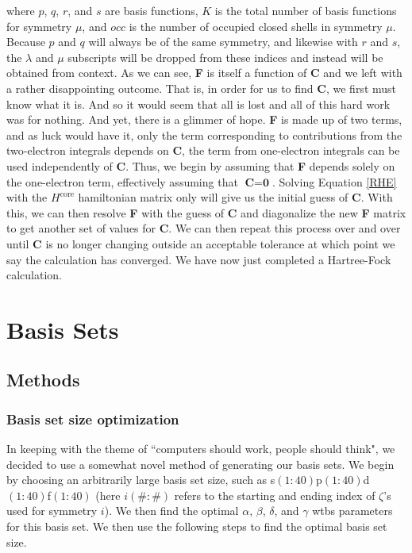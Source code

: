 \documentclass[12pt]{report}
\begin{document}
where $p$, $q$, $r$, and $s$ are basis functions, $K$ is the total number of basis functions for symmetry $\mu$, and $occ$ is the number of occupied closed shells in symmetry $\mu$. Because $p$ and $q$ will always be of the same symmetry, and likewise with $r$ and $s$, the $\lambda$ and $\mu$ subscripts will be dropped from these indices and instead will be obtained from context. As we can see, \textbf{F} is itself a function of \textbf{C} and we left with a rather disappointing outcome. That is, in order for us to find \textbf{C}, we first must know what it is. And so it would seem that all is lost and all of this hard work was for nothing. And yet, there is a glimmer of hope. \textbf{F} is made up of two terms, and as luck would have it, only the term corresponding to contributions from the two-electron integrals depends on \textbf{C}, the term from one-electron integrals can be used independently of \textbf{C}. Thus, we begin by assuming that \textbf{F} depends solely on the one-electron term, effectively assuming that $\textbf{C}=\textbf{0}$. Solving Equation \ref{RHE} with the $H^{\text{core}}$ hamiltonian matrix only will give us the initial guess of \textbf{C}. With this, we can then resolve \textbf{F} with the guess of \textbf{C} and diagonalize the new \textbf{F} matrix to get another set of values for \textbf{C}. We can then repeat this process over and over until \textbf{C} is no longer changing outside an acceptable tolerance at which point we say the calculation has converged. We have now just completed a Hartree-Fock calculation.



\chapter{Basis Sets}
\label{chap:basis_sets}
\section{Methods}
\subsection{Basis set size optimization}
In keeping with the theme of ``computers should work, people should think", we decided to use a somewhat novel method of generating our basis sets. We begin by choosing an arbitrarily large basis set size, such as s$(1:40)$p$(1:40)$d$(1:40)$f$(1:40)$ (here $i(\#:\#)$ refers to the starting and ending index of $\zeta$'s used for symmetry $i$). We then find the optimal $\alpha$, $\beta$, $\delta$, and $\gamma$ wtbs parameters for this basis set. We then use the following steps to find the optimal basis set size.
\end{document}

